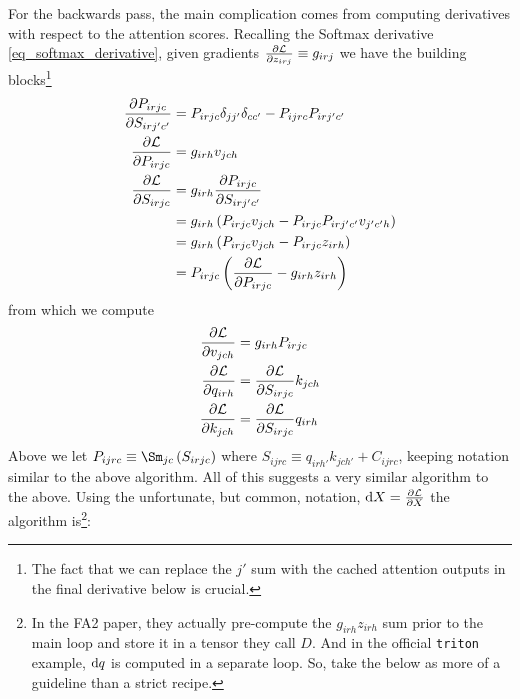 For the backwards pass, the main complication comes from computing derivatives with respect to the
attention scores. Recalling the Softmax derivative \eqref{eq_softmax_derivative}, given gradients $
\frac{\partial \mathcal{L}   }{ \partial z _{ irj } } \equiv  g _{ irj } $ we have the building
blocks\footnote{The fact that we can replace the  $ j' $ sum with the cached attention outputs in
the final derivative below is crucial.}
\begin{align}
    \frac{ \partial P _{ irjc } }{ \partial S _{ irj'c' } } &= P _{ irjc}\delta _{ jj' }\delta _{ c c'} - P _{ ijrc } P _{ irj'c' } \nonumber\\
    \frac{ \partial \mathcal{L} }{ \partial P _{ irjc } } &= g _{ irh } v _{ jch }  \nonumber\\
    \frac{ \partial \mathcal{L} }{ \partial S _{ irjc } } &= g _{ irh } \frac{ \partial P _{ irjc } }{ \partial S _{ irj'c' } }\nonumber\\
                                                    &= g _{ irh } \left ( P _{ irjc } v _{ jch } - P _{ irjc } P _{ ir j'c' } v _{ j'c'h }  \right )  \nonumber\\
                                                    &= g _{ irh } \left ( P _{ irjc } v _{ jch } - P _{ irjc }  z _{irh }  \right )\nonumber\\
                                                    &= P _{ irjc }\left(\frac{ \partial \mathcal{L} }{ \partial P _{ irjc } }  -g _{ irh }   z _{irh } \right)\label{eq_fa2_derivative_building_blocks}
\end{align}
from which we compute
\begin{align}
    \frac{ \partial \mathcal{L} }{ \partial v _{ jch } } &= g _{ irh } P _{ irjc }  \nonumber\\
    \frac{ \partial \mathcal{L} }{ \partial q _{ irh } } &=  \frac{ \partial \mathcal{L} }{ \partial S _{ irjc } }k _{ jch } \nonumber\\
    \frac{ \partial \mathcal{L} }{ \partial k _{ jch } } &=  \frac{ \partial \mathcal{L} }{ \partial S _{ irjc } }q _{ irh }
\end{align}
Above we let $ P _{ ijrc } \equiv \Sm _{ jc}\left ( S _{ irjc } \right ) $ where $ S _{ ijrc }
\equiv   q _{ irh' } k _{ jch' } + C _{ ijrc }$, keeping notation similar to the above
algorithm. All of this suggests a very similar algorithm to the above. Using the unfortunate, but
common, notation,  $ {\rm d} X =  \frac{ \partial \mathcal{L}  }{ \partial X  } $ the algorithm is\footnote{In
the FA2 paper, they actually pre-compute the $ g _{ irh } z _{ irh } $  sum prior to the main loop
and store it in a tensor they call $ D $. And in the official \texttt{triton} example, $ {\rm d} q $ is
computed in a separate loop. So, take the below as more of a guideline than a strict recipe.}:

